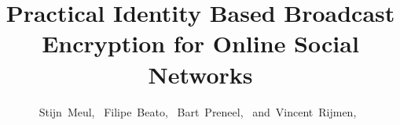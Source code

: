 \documentclass[journal]{IEEEtran}
\begin{document}
%
\title{Practical Identity Based Broadcast Encryption for Online Social Networks}
%
%
%

\author{Stijn~Meul,~\IEEEmembership{}
        Filipe~Beato,~\IEEEmembership{}
        Bart~Preneel,~\IEEEmembership{}
        and~Vincent~Rijmen,~\IEEEmembership{}%
}

% 
%



\markboth{}%
{}
% 




\end{document}
